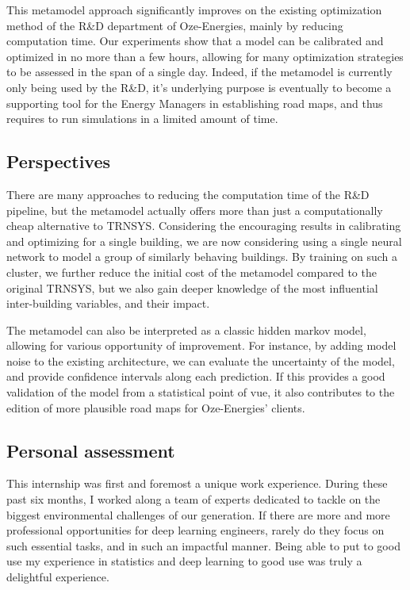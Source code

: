 \documentclass[12pt]{article}
\begin{document}
This metamodel approach significantly improves on the existing optimization method of the R\&D department of Oze-Energies, mainly by reducing computation time. Our experiments show that a model can be calibrated and optimized in no more than a few hours, allowing for many optimization strategies to be assessed in the span of a single day. Indeed, if the metamodel is currently only being used by the R\&D, it's underlying purpose is eventually to become a supporting tool for the Energy Managers in establishing road maps, and thus requires to run simulations in a limited amount of time.

\subsection{Perspectives}
There are many approaches to reducing the computation time of the R\&D pipeline, but the metamodel actually offers more than just a computationally cheap alternative to TRNSYS. Considering the encouraging results in calibrating and optimizing for a single building, we are now considering using a single neural network to model a group of similarly behaving buildings. By training on such a cluster, we further reduce the initial cost of the metamodel compared to the original TRNSYS, but we also gain deeper knowledge of the most influential inter-building variables, and their impact.

The metamodel can also be interpreted as a classic hidden markov model, allowing for various opportunity of improvement. For instance, by adding model noise to the existing architecture, we can evaluate the uncertainty of the model, and provide confidence intervals along each prediction. If this provides a good validation of the model from a statistical point of vue, it also contributes to the edition of more plausible road maps for Oze-Energies' clients.

\subsection{Personal assessment}
This internship was first and foremost a unique work experience. During these past six months, I worked along a team of experts dedicated to tackle on the biggest environmental challenges of our generation. If there are more and more professional opportunities for deep learning engineers, rarely do they focus on such essential tasks, and in such an impactful manner. Being able to put to good use my experience in statistics and deep learning to good use was truly a delightful experience.
\end{document}
